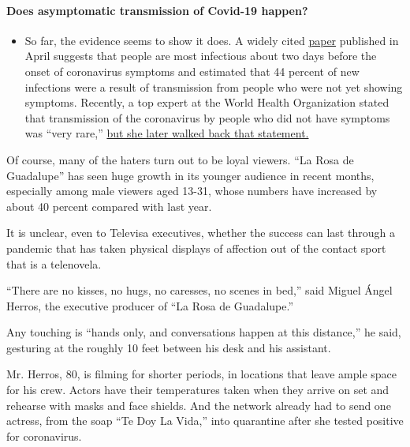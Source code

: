 \begin{itemize}
{  \paragraph{Does asymptomatic transmission of Covid-19
  happen?}\label{does-asymptomatic-transmission-of-covid-19-happen}}

  \begin{itemize}
  \tightlist
  \item
    So far, the evidence seems to show it does. A widely cited
    \href{https://www.nature.com/articles/s41591-020-0869-5}{paper}
    published in April suggests that people are most infectious about
    two days before the onset of coronavirus symptoms and estimated that
    44 percent of new infections were a result of transmission from
    people who were not yet showing symptoms. Recently, a top expert at
    the World Health Organization stated that transmission of the
    coronavirus by people who did not have symptoms was ``very rare,''
    \href{https://www.nytimes.com/2020/06/09/world/coronavirus-updates.html?action=click\&pgtype=Article\&state=default\&region=MAIN_CONTENT_3\&context=storylines_faq\#link-1f302e21}{but
    she later walked back that statement.}
  \end{itemize}
\end{itemize}

Of course, many of the haters turn out to be loyal viewers. ``La Rosa de
Guadalupe'' has seen huge growth in its younger audience in recent
months, especially among male viewers aged 13-31, whose numbers have
increased by about 40 percent compared with last year.

It is unclear, even to Televisa executives, whether the success can last
through a pandemic that has taken physical displays of affection out of
the contact sport that is a telenovela.

``There are no kisses, no hugs, no caresses, no scenes in bed,'' said
Miguel Ángel Herros, the executive producer of ``La Rosa de Guadalupe.''

Any touching is ``hands only, and conversations happen at this
distance,'' he said, gesturing at the roughly 10 feet between his desk
and his assistant.

Mr. Herros, 80, is filming for shorter periods, in locations that leave
ample space for his crew. Actors have their temperatures taken when they
arrive on set and rehearse with masks and face shields. And the network
already had to send one actress, from the soap ``Te Doy La Vida,'' into
quarantine after she tested positive for coronavirus.

